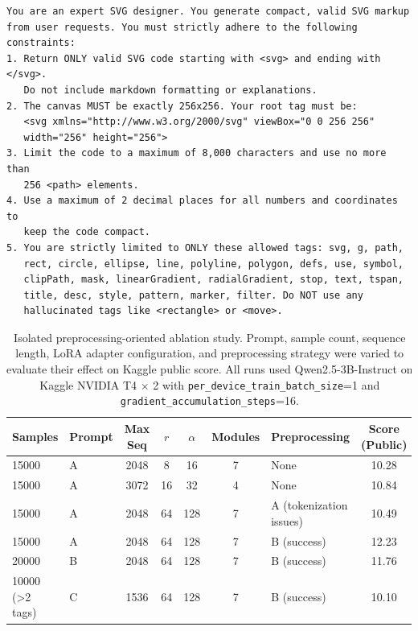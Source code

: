 \documentclass[11pt]{article}
\begin{document}
\begin{table}[!t]
\centering
\begin{minipage}{0.96\textwidth}
\footnotesize
\begin{verbatim}
You are an expert SVG designer. You generate compact, valid SVG markup
from user requests. You must strictly adhere to the following constraints:
1. Return ONLY valid SVG code starting with <svg> and ending with </svg>.
   Do not include markdown formatting or explanations.
2. The canvas MUST be exactly 256x256. Your root tag must be:
   <svg xmlns="http://www.w3.org/2000/svg" viewBox="0 0 256 256"
   width="256" height="256">
3. Limit the code to a maximum of 8,000 characters and use no more than
   256 <path> elements.
4. Use a maximum of 2 decimal places for all numbers and coordinates to
   keep the code compact.
5. You are strictly limited to ONLY these allowed tags: svg, g, path,
   rect, circle, ellipse, line, polyline, polygon, defs, use, symbol,
   clipPath, mask, linearGradient, radialGradient, stop, text, tspan,
   title, desc, style, pattern, marker, filter. Do NOT use any
   hallucinated tags like <rectangle> or <move>.
\end{verbatim}
\end{minipage}
\caption{Designer-oriented system prompt used in the final 3072-token AMD
experiments.}
\label{tab:prompt-designer}
\end{table}

\begin{table}[!t]
\centering
\small
\begin{tabular}{l l c c c c l c}
\hline
Samples & Prompt & Max Seq & $r$ & $\alpha$ & Modules & Preprocessing & Score (Public) \\
\hline
15000 & A & 2048 & 8 & 16 & 7 & None & 10.28 \\
15000 & A & 3072 & 16 & 32 & 4 & None & 10.84 \\
15000 & A & 2048 & 64 & 128 & 7 & A (tokenization issues) & 10.49 \\
15000 & A & 2048 & 64 & 128 & 7 & B (success) & 12.23 \\
20000 & B & 2048 & 64 & 128 & 7 & B (success) & 11.76 \\
10000 (>2 tags) & C & 1536 & 64 & 128 & 7 & B (success) & 10.10 \\
\hline
\end{tabular}
\caption{Isolated preprocessing-oriented ablation study. Prompt, sample count,
sequence length, LoRA adapter configuration, and preprocessing strategy were
varied to evaluate their effect on Kaggle public score. All runs used
Qwen2.5-3B-Instruct on Kaggle NVIDIA T4 $\times$ 2 with
\texttt{per\_device\_train\_batch\_size}=1 and
\texttt{gradient\_accumulation\_steps}=16.}
\label{tab:preprocessing_ablation}
\end{table}
\end{document}
